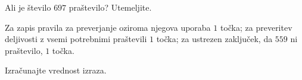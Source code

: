 \documentclass[addpoints]{exam}
\begin{document}
\begin{questions}




        \question[3]
        Ali je število $697$ praštevilo? Utemeljite.
        
        \begin{solution}[7cm]
            Za zapis pravila za preverjanje oziroma njegova uporaba $1$ točka; za preveritev deljivosti z vsemi potrebnimi praštevili $1$ točka;
            za ustrezen zaključek, da $559$ ni praštevilo, $1$ točka.
        \end{solution}
    

    \question
    Izračunajte vrednost izraza.
\end{questions}
\end{document}
